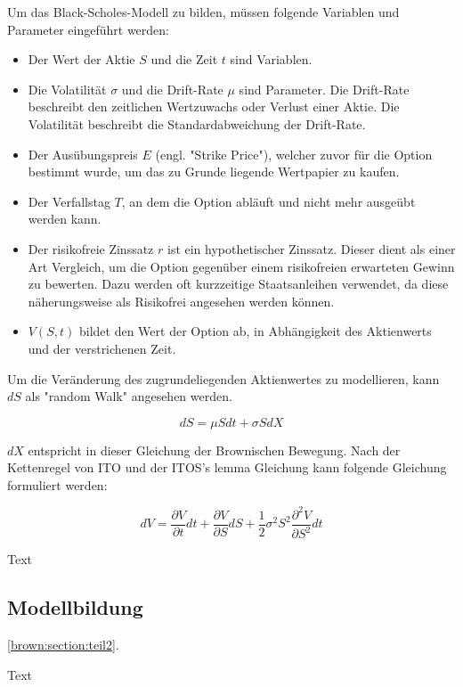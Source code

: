 Um das Black-Scholes-Modell zu bilden, müssen folgende Variablen und Parameter eingeführt werden:

\begin{itemize}
	\item Der Wert der Aktie $ S $ und die Zeit $ t $  sind Variablen.
	\item Die Volatilität $ \sigma $ und die Drift-Rate $ \mu $ sind Parameter. Die Drift-Rate beschreibt den zeitlichen Wertzuwachs oder Verlust einer Aktie. Die Volatilität beschreibt die Standardabweichung der Drift-Rate.
	\item Der Ausübungspreis $ E $ (engl. "Strike Price"), welcher zuvor für die Option bestimmt wurde, um das zu Grunde liegende Wertpapier zu kaufen. 
	\item Der Verfallstag $ T $, an dem die Option abläuft und nicht mehr ausgeübt werden kann.
	\item Der risikofreie Zinssatz $ r $ ist ein hypothetischer Zinssatz. Dieser dient als einer Art Vergleich, um die Option gegenüber einem risikofreien erwarteten Gewinn zu bewerten. Dazu werden oft kurzzeitige Staatsanleihen verwendet, da diese näherungsweise als Risikofrei angesehen werden können.
	\item $ V(S,t) $ bildet den Wert der Option ab, in Abhängigkeit des Aktienwerts und der verstrichenen Zeit.
\end{itemize}

Um die Veränderung des zugrundeliegenden Aktienwertes zu modellieren, kann $ dS $ als "random Walk" angesehen werden.

\begin{equation}
	dS = \mu S dt + \sigma S dX
\end{equation}

$ dX $ entspricht in dieser Gleichung der Brownischen Bewegung. Nach der Kettenregel von ITO und der ITOS's lemma Gleichung kann folgende Gleichung formuliert werden:

\begin{equation}
	dV = \frac{\partial{V}}{\partial{t}} dt + \frac{\partial{V}}{\partial{S}} dS+ \frac{1}{2} \sigma^2 S^2 \frac{\partial^2{V}}{\partial{S^2}} dt
\end{equation}

Text

\subsection{Modellbildung\label{rown:BlackScholes:modell}}
\ref{brown:section:teil2}.

Text
